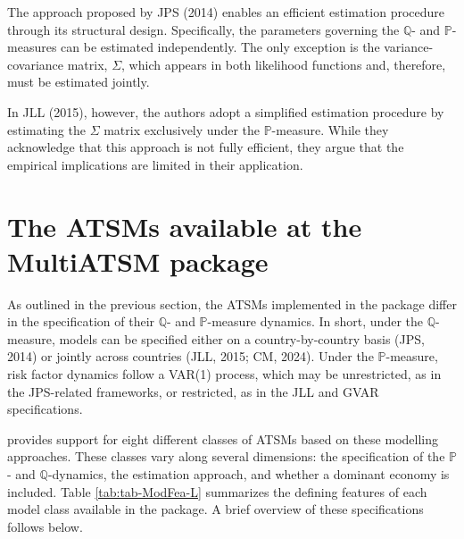 The approach proposed by JPS (2014) enables an efficient estimation procedure through its structural design. Specifically, the parameters governing the \(\mathbb{Q}\)- and \(\mathbb{P}\)-measures can be estimated independently. The only exception is the variance-covariance matrix, \(\Sigma\), which appears in both likelihood functions and, therefore, must be estimated jointly.

In JLL (2015), however, the authors adopt a simplified estimation procedure by estimating the \(\Sigma\) matrix exclusively under the \(\mathbb{P}\)-measure. While they acknowledge that this approach is not fully efficient, they argue that the empirical implications are limited in their application.

\section{The ATSMs available at the MultiATSM package}\label{S:ATSMoptions}

As outlined in the previous section, the ATSMs implemented in the  package differ in the specification of their \(\mathbb{Q}\)- and \(\mathbb{P}\)-measure dynamics. In short, under the \(\mathbb{Q}\)-measure, models can be specified either on a country-by-country basis (JPS, 2014) or jointly across countries (JLL, 2015; CM, 2024). Under the \(\mathbb{P}\)-measure, risk factor dynamics follow a VAR(1) process, which may be unrestricted, as in the JPS-related frameworks, or restricted, as in the JLL and GVAR specifications.

 provides support for eight different classes of ATSMs based on these modelling approaches. These classes vary along several dimensions: the specification of the \(\mathbb{P}\)- and \(\mathbb{Q}\)-dynamics, the estimation approach, and whether a dominant economy is included. Table \ref{tab:tab-ModFea-L} summarizes the defining features of each model class available in the package. A brief overview of these specifications follows below.

